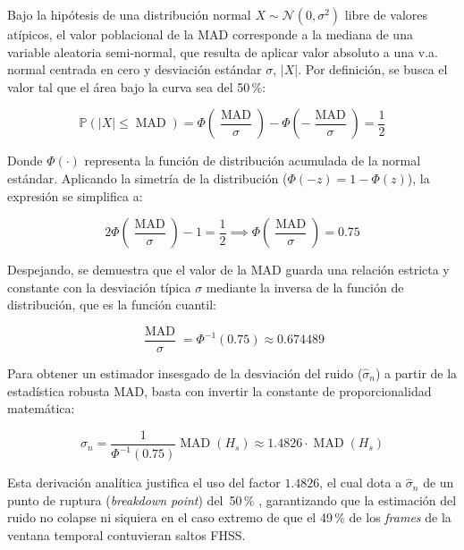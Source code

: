 Bajo la hipótesis de una distribución normal $X \sim \mathcal{N}(0, \sigma^2)$ libre de valores atípicos, el valor poblacional de la MAD corresponde a la mediana de una variable aleatoria semi-normal, que resulta de aplicar valor absoluto a una v.a. normal centrada en cero y desviación estándar $\sigma$, $|X|$. Por definición, se busca el valor tal que el área bajo la curva sea del 50\,\%:

\begin{equation}
    \mathbb{P}(|X| \le \operatorname{MAD}) = \Phi\left(\frac{\operatorname{MAD}}{\sigma}\right) - \Phi\left(-\frac{\operatorname{MAD}}{\sigma}\right) = \frac{1}{2}
\end{equation}

Donde $\Phi(\cdot)$ representa la función de distribución acumulada de la normal estándar. Aplicando la simetría de la distribución ($\Phi(-z) = 1 - \Phi(z)$), la expresión se simplifica a:

\begin{equation}
    2\Phi\left(\frac{\operatorname{MAD}}{\sigma}\right) - 1 = \frac{1}{2} \implies \Phi\left(\frac{\operatorname{MAD}}{\sigma}\right) = 0.75
\end{equation}

Despejando, se demuestra que el valor de la MAD guarda una relación estricta y constante con la desviación típica $\sigma$ mediante la inversa de la función de distribución, que es la función cuantil:

\begin{equation}
    \frac{\operatorname{MAD}}{\sigma} = \Phi^{-1}(0.75) \approx 0.674489
\end{equation}

Para obtener un estimador insesgado de la desviación del ruido ($\hat{\sigma}_n$) a partir de la estadística robusta MAD, basta con invertir la constante de proporcionalidad matemática:

\begin{equation}
    \hat{\sigma}_n = \frac{1}{\Phi^{-1}(0.75)} \operatorname{MAD}(H_s) \approx 1.4826 \cdot \operatorname{MAD}(H_s)
    \label{eq:mad_escala}
\end{equation}

Esta derivación analítica justifica el uso del factor $1.4826$, el cual dota a $\hat{\sigma}_n$ de un punto de ruptura (\textit{breakdown point}) del~50\,\% \cite{hampel_robust_1986}, garantizando que la estimación del ruido no colapse ni siquiera en el caso extremo de que el 49\,\% de los \textit{frames} de la ventana temporal contuvieran saltos FHSS.

